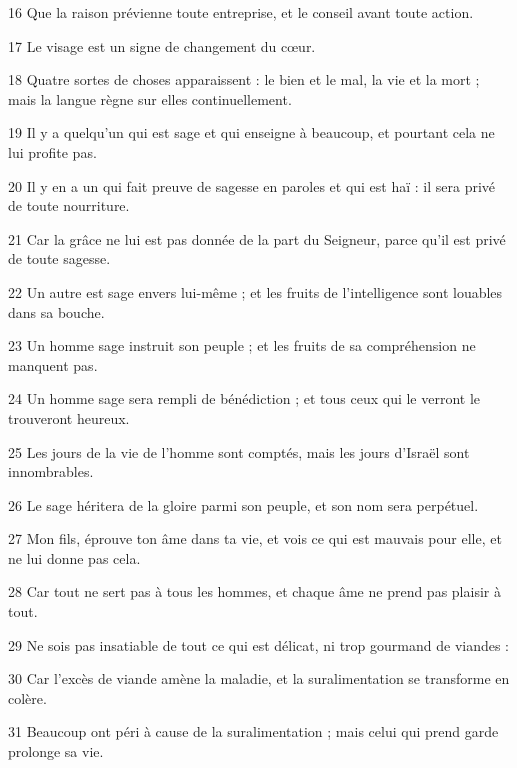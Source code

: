 \par 16 Que la raison prévienne toute entreprise, et le conseil avant toute action.
\par 17 Le visage est un signe de changement du cœur.
\par 18 Quatre sortes de choses apparaissent : le bien et le mal, la vie et la mort ; mais la langue règne sur elles continuellement.
\par 19 Il y a quelqu'un qui est sage et qui enseigne à beaucoup, et pourtant cela ne lui profite pas.
\par 20 Il y en a un qui fait preuve de sagesse en paroles et qui est haï : il sera privé de toute nourriture.
\par 21 Car la grâce ne lui est pas donnée de la part du Seigneur, parce qu'il est privé de toute sagesse.
\par 22 Un autre est sage envers lui-même ; et les fruits de l'intelligence sont louables dans sa bouche.
\par 23 Un homme sage instruit son peuple ; et les fruits de sa compréhension ne manquent pas.
\par 24 Un homme sage sera rempli de bénédiction ; et tous ceux qui le verront le trouveront heureux.
\par 25 Les jours de la vie de l'homme sont comptés, mais les jours d'Israël sont innombrables.
\par 26 Le sage héritera de la gloire parmi son peuple, et son nom sera perpétuel.
\par 27 Mon fils, éprouve ton âme dans ta vie, et vois ce qui est mauvais pour elle, et ne lui donne pas cela.
\par 28 Car tout ne sert pas à tous les hommes, et chaque âme ne prend pas plaisir à tout.
\par 29 Ne sois pas insatiable de tout ce qui est délicat, ni trop gourmand de viandes :
\par 30 Car l'excès de viande amène la maladie, et la suralimentation se transforme en colère.
\par 31 Beaucoup ont péri à cause de la suralimentation ; mais celui qui prend garde prolonge sa vie.


